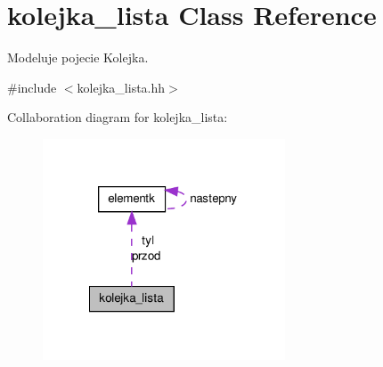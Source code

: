\hypertarget{classkolejka__lista}{\section{kolejka\-\_\-lista Class Reference}
\label{classkolejka__lista}
}


Modeluje pojecie Kolejka.  




{\ttfamily \#include $<$kolejka\-\_\-lista.\-hh$>$}



Collaboration diagram for kolejka\-\_\-lista\-:\nopagebreak
\begin{figure}[H]
\begin{center}
\leavevmode
\includegraphics[width=204pt]{classkolejka__lista__coll__graph}
\end{center}
\end{figure}
